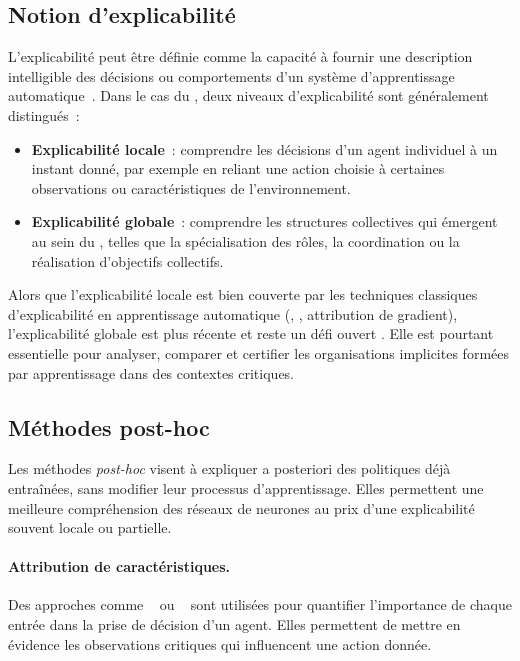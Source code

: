 \subsection{Notion d'explicabilité}

\noindent
L'explicabilité peut être définie comme la capacité à fournir une description intelligible
des décisions ou comportements d'un système d'apprentissage automatique~\cite{doshivelez2017rigorous}.
Dans le cas du , deux niveaux d'explicabilité sont généralement distingués~:
\begin{itemize}
  \item \textbf{Explicabilité locale}~: comprendre les décisions d'un agent individuel
        à un instant donné, par exemple en reliant une action choisie
        à certaines observations ou caractéristiques de l'environnement.
  \item \textbf{Explicabilité globale}~: comprendre les structures collectives
        qui émergent au sein du , telles que la spécialisation
        des rôles, la coordination ou la réalisation d'objectifs collectifs.
\end{itemize}

Alors que l'explicabilité locale est bien couverte par les techniques classiques
d'explicabilité en apprentissage automatique (, , attribution de gradient),
l'explicabilité globale est plus récente et reste un défi ouvert
\cite{poupart2025perspectives, milani2022maviper}.
Elle est pourtant essentielle pour analyser, comparer et certifier
les organisations implicites formées par apprentissage dans des contextes critiques.

\subsection{Méthodes post-hoc}

\noindent
Les méthodes \textit{post-hoc} visent à expliquer a posteriori des politiques déjà entraînées,
sans modifier leur processus d'apprentissage.
Elles permettent une meilleure compréhension des réseaux de neurones
au prix d'une explicabilité souvent locale ou partielle.

\paragraph{Attribution de caractéristiques.}
Des approches comme ~\cite{bach2015lrp}
ou ~\cite{lundberg2017unified}
sont utilisées pour quantifier l'importance de chaque entrée
dans la prise de décision d'un agent.
Elles permettent de mettre en évidence les observations critiques
qui influencent une action donnée.

